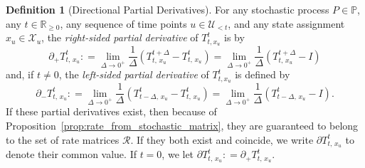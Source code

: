 \documentclass[10pt,a4paper]{paper}
\theoremstyle{definition}
\newtheorem{definition}{Definition}
\newcommand{\reals}{\mathbb{R}}
\newcommand{\realsnonneg}{\reals_{\geq 0}}
\newcommand{\states}{\mathcal{X}}
\newcommand{\processes}{\mathbb{P}}
\newcommand{\coloneqq}{:\!=}
\begin{document}
\begin{definition}[Directional Partial Derivatives]\label{def:direc_partial_deriv}
For any stochastic process $P\in\processes$, any $t\in\realsnonneg$, any sequence of time points $u\in\mathcal{U}_{<t}$, and any state assignment $x_u\in\states_u$, the \emph{right-sided partial derivative} of $T_{t,x_u}^t$ is by
\begin{equation*}
\partial_{+}{T_{t,\,x_u}^t}
\coloneqq
\lim_{\Delta\to 0^{+}}
\frac{1}{\Delta}
(T^{t+\Delta}_{t,\,x_u}-T^t_{t,\,x_u})
=
\lim_{\Delta\to 0^{+}}
\frac{1}{\Delta}
(T^{t+\Delta}_{t,\,x_u}-I)
\end{equation*}
and, if $t\neq0$, the \emph{left-sided partial derivative} of $T_{t,x_u}^t$ is defined by
\begin{equation*}
\partial_{-}{T_{t,\,x_u}^t}
\coloneqq
\lim_{\Delta\to 0^{+}}
\frac{1}{\Delta}
(T^{t}_{t-\Delta,\,x_u}-T^t_{t,\,x_u})
=
\lim_{\Delta\to 0^{+}}
\frac{1}{\Delta}
(T^{t}_{t-\Delta,\,x_u}-I).
\end{equation*}
If these partial derivatives exist, then because of Proposition~\ref{prop:rate_from_stochastic_matrix}, they are guaranteed to belong to the set of rate matrices  $\mathcal{R}$. If they both exist and coincide, we write $\partial{T_{t,\,x_u}^t}$ to denote their common value. If $t=0$, we let $\partial{T_{t,\,x_u}^t}\coloneqq\partial_{+}{T_{t,\,x_u}^t}$.
\end{definition}
\end{document}
